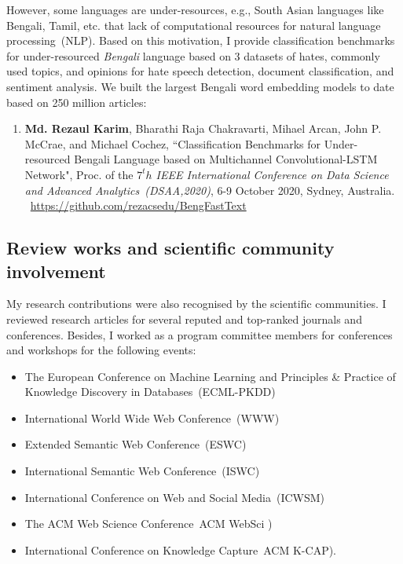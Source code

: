 \begin{appendices}
\hspace*{5mm} However, some languages are under-resources, e.g., South Asian languages like Bengali, Tamil, etc. that lack of computational resources for natural language processing~(NLP). Based on this motivation, I provide classification benchmarks for under-resourced \textit{Bengali} language based on 3 datasets of hates, commonly used topics, and opinions for hate speech detection, document classification, and sentiment analysis. We built the largest Bengali word embedding models to date based on 250 million articles:

\begin{enumerate}[noitemsep]
	\item \textbf{Md. Rezaul Karim}, Bharathi Raja Chakravarti, Mihael Arcan, John P. McCrae, and Michael Cochez, ``Classification Benchmarks for Under-resourced Bengali Language based on Multichannel Convolutional-LSTM Network", Proc. of the \emph{$7^th$ IEEE International Conference on Data Science and Advanced Analytics~(DSAA,2020)}, 6-9 October 2020, Sydney, Australia.
	\faGithub~\url{https://github.com/rezacsedu/BengFastText}
\end{enumerate}

\subsection*{Review works and scientific community involvement}%
My research contributions were also recognised by the scientific communities. I reviewed research articles for several reputed and top-ranked journals and conferences. Besides, I worked as a program committee members for conferences and workshops for the following events: 

\begin{itemize}[noitemsep]
    \item The European Conference on Machine Learning and Principles \& Practice of Knowledge Discovery in Databases~(ECML-PKDD)
    \item International World Wide Web Conference~(WWW)
    \item Extended Semantic Web Conference~(ESWC) 
    \item International Semantic Web Conference~(ISWC) 
    \item International Conference on Web and Social Media~(ICWSM) 
    \item The ACM Web Science Conference~ACM WebSci )
    \item International Conference on Knowledge Capture~ACM K-CAP).
\end{itemize}


\end{appendices}
